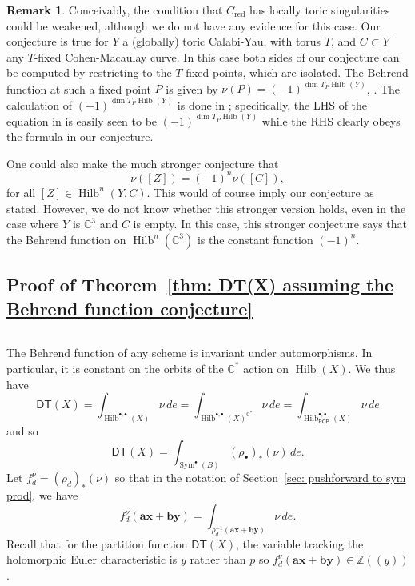 \documentclass[12pt]{amsart}
\theoremstyle{definition}
\newtheorem{remark}[theorem]{Remark}
\newcommand{\CC} {\mathbb{C}}          %
\newcommand{\ZZ} {\mathbb{Z}}		%
\newcommand{\Sym}{\operatorname{Sym}}
\newcommand{\Hilb}{\operatorname{Hilb}}
\newcommand{\DT}{\mathsf{DT}}
\newcommand{\boldx}{\boldsymbol{x}}
\newcommand{\boldy}{\boldsymbol{y}}
\newcommand{\bolda}{\boldsymbol{a}}
\newcommand{\boldb}{\boldsymbol{b}}
\newcommand{\PCP}{\mathsf{PCP}}
\newcommand{\red}{\mathrm{red}}
\newcommand{\SubSecSpace}{$\,$\vspace{0.2cm}\par } %
\begin{document}
\begin{remark}
Conceivably, the condition that $C_{\red}$ has locally toric
singularities could be weakened, although we do not have any evidence
for this case. Our conjecture is true for $Y$ a (globally) toric
Calabi-Yau, with torus $T$, and $C \subset Y$ any $T$-fixed
Cohen-Macaulay curve. In this case both sides of our conjecture can be
computed by restricting to the $T$-fixed points, which are
isolated. The Behrend function at such a fixed point $P$ is given by $\nu(P) =
(-1)^{\dim T_P\Hilb (Y)}$, \cite[Thm.~3.4]{Behrend-Fantechi08}. The
calculation of $(-1)^{\dim T_{P}\Hilb (Y)}$ is done in \cite{MNOP1};
specifically, the LHS of the equation in \cite[Thm~2]{MNOP1} is easily
seen to be $(-1)^{\dim T_{P}\Hilb (Y)}$ while the RHS clearly obeys the
formula in our conjecture.

One could also make the much stronger conjecture that 
\[
\nu ([Z]) = (-1)^{n} \nu ([C]),
\]
for all $[Z]\in \Hilb^{n}(Y,C)$. This would of course imply our
conjecture as stated. However, we do not know whether this stronger version
holds, even in the case where $Y$ is $\CC^{3}$ and $C$ is empty. In
this case, this stronger conjecture says that the Behrend function
on $\Hilb^{n}(\CC^{3})$ is the constant function $(-1)^{n}$.
\end{remark}


\subsection{Proof of Theorem~\ref{thm: DT(X) assuming the Behrend
function conjecture}}\SubSecSpace 

The Behrend function of any scheme is invariant under
automorphisms. In particular, it is constant on the orbits of the
$\CC^{*}$ action on $\Hilb (X)$. We thus have
\[
\DT (X) = \int_{\Hilb^{\bullet ,\bullet}(X)} \nu \, de =
\int_{\Hilb^{\bullet ,\bullet}(X)^{\CC^{*}}} \nu \, de =
\int_{\Hilb_{\PCP }^{\bullet ,\bullet}(X)} \nu \, de
\]
and so
\[
\DT (X)  =\int_{\Sym^{\bullet}(B)} (\rho_{\bullet})_{*} (\nu )\, de.
\]
Let $f^{\nu}_{d} = (\rho_{d})_{*}(\nu )$ so that in the notation of
Section~\ref{sec: pushforward to sym prod}, we have
\[
f^{\nu}_{d}(\bolda \boldx +\boldb \boldy ) =
\int_{\rho^{-1}_{d}(\bolda \boldx +\boldb \boldy )} \nu \, de.
\]
Recall that for the partition function $\DT (X)$, the variable
tracking the holomorphic Euler characteristic is $y$ rather than $p$
so $f_{d}^{\nu}(\bolda \boldx +\boldb \boldy )\in \ZZ (\!(y)\!)$.
\end{document}
